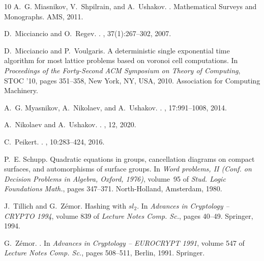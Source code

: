 \documentclass{jgcc}
\begin{document}
\begin{thebibliography}{10}
A.~G. {Miasnikov}, V.~{Shpilrain}, and A.~{Ushakov}.
.
\newblock Mathematical Surveys and Monographs. AMS, 2011.

D.~{Micciancio} and O.~{Regev}.
.
, 37(1):267--302, 2007.

D.~{Micciancio} and P.~{Voulgaris}.
\newblock A deterministic single exponential time algorithm for most lattice problems based on voronoi cell computations.
\newblock In {\em Proceedings of the Forty-Second ACM Symposium on Theory of Computing}, STOC '10, pages 351--358, New York, NY, USA, 2010. Association for Computing Machinery.

A.~G. {Myasnikov}, A.~{Nikolaev}, and A.~{Ushakov}.
.
, 17:991--1008, 2014.

A.~{Nikolaev} and A.~{Ushakov}.
.
, 12, 2020.

C.~{Peikert}.
.
, 10:283--424, 2016.

P.~E. {Schupp}.
\newblock Quadratic equations in groups, cancellation diagrams on compact surfaces, and automorphisms of surface groups.
\newblock In {\em Word problems, {II} ({C}onf. on {D}ecision {P}roblems in {A}lgebra, {O}xford, 1976)}, volume~95 of {\em Stud. Logic Foundations Math.}, pages 347--371. North-Holland, Amsterdam, 1980.

J.~{Tillich} and G.~{Z\'emor}.
\newblock Hashing with $sl_2$.
\newblock In {\em Advances in Cryptology -- CRYPTO 1994}, volume 839 of {\em Lecture Notes Comp. Sc.}, pages 40--49. Springer, 1994.

G.~Z{\'e}mor.
.
\newblock In {\em Advances in Cryptology -- EUROCRYPT 1991}, volume 547 of {\em Lecture Notes Comp. Sc.}, pages 508--511, Berlin, 1991. Springer.

\end{thebibliography}
\end{document}

